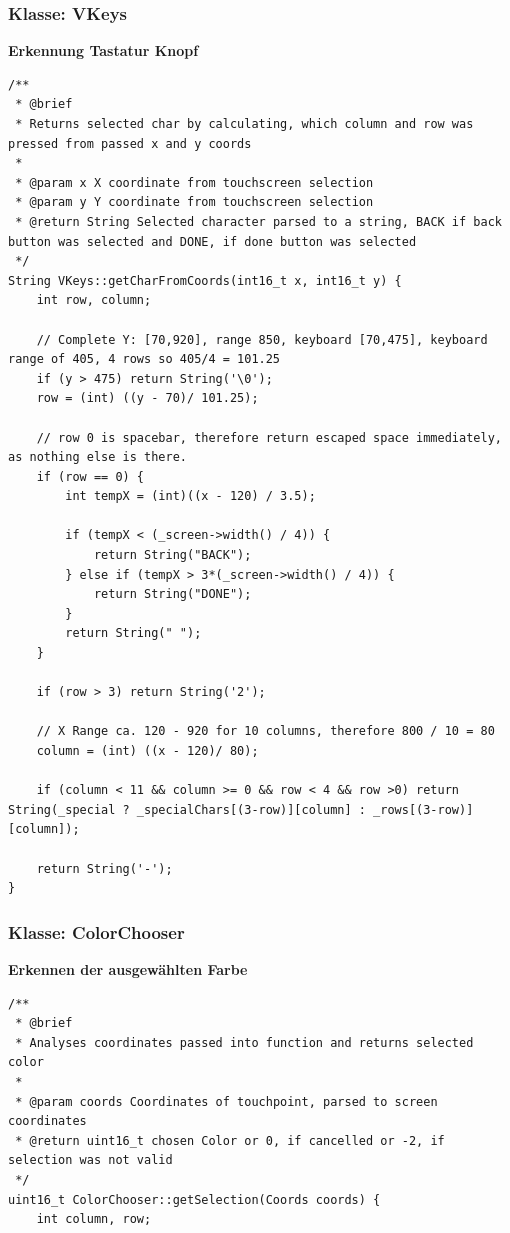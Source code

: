 \documentclass[a4paper, 11pt]{scrartcl}
\begin{document}
\begin{small}
\subsubsection{Klasse: VKeys}
\begin{flushleft}
    \textbf{Erkennung Tastatur Knopf}\label{code:keys}
\end{flushleft}
\begin{lstlisting}
/**
 * @brief 
 * Returns selected char by calculating, which column and row was pressed from passed x and y coords
 * 
 * @param x X coordinate from touchscreen selection
 * @param y Y coordinate from touchscreen selection
 * @return String Selected character parsed to a string, BACK if back button was selected and DONE, if done button was selected
 */
String VKeys::getCharFromCoords(int16_t x, int16_t y) {
    int row, column;

    // Complete Y: [70,920], range 850, keyboard [70,475], keyboard range of 405, 4 rows so 405/4 = 101.25
    if (y > 475) return String('\0');
    row = (int) ((y - 70)/ 101.25);

    // row 0 is spacebar, therefore return escaped space immediately, as nothing else is there.
    if (row == 0) {
        int tempX = (int)((x - 120) / 3.5);

        if (tempX < (_screen->width() / 4)) {
            return String("BACK");
        } else if (tempX > 3*(_screen->width() / 4)) {
            return String("DONE");
        }
        return String(" ");
    }

    if (row > 3) return String('2');

    // X Range ca. 120 - 920 for 10 columns, therefore 800 / 10 = 80
    column = (int) ((x - 120)/ 80);

    if (column < 11 && column >= 0 && row < 4 && row >0) return String(_special ? _specialChars[(3-row)][column] : _rows[(3-row)][column]);
    
    return String('-');
}
\end{lstlisting}

\subsubsection{Klasse: ColorChooser}
\begin{flushleft}\textbf{Erkennen der ausgewählten Farbe}\label{code:color}\end{flushleft}
\begin{lstlisting}
/**
 * @brief 
 * Analyses coordinates passed into function and returns selected color
 * 
 * @param coords Coordinates of touchpoint, parsed to screen coordinates
 * @return uint16_t chosen Color or 0, if cancelled or -2, if selection was not valid
 */
uint16_t ColorChooser::getSelection(Coords coords) {
    int column, row;


\end{lstlisting}
\end{small}
\end{document}
